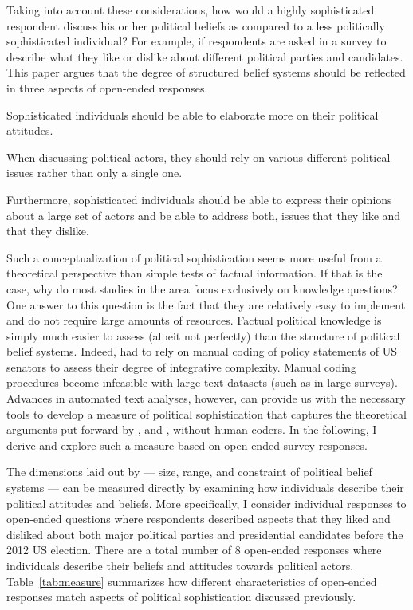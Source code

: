 \documentclass[12pt]{article}
\begin{document}
Taking into account these considerations, how would a highly sophisticated respondent discuss his or her political beliefs as compared to a less politically sophisticated individual? For example, if respondents are asked in a survey to describe what they like or dislike about different political parties and candidates. This paper argues that the degree of structured belief systems should be reflected in three aspects of open-ended responses.

Sophisticated individuals should be able to elaborate more on their political attitudes.

When discussing political actors, they should rely on various different political issues rather than only a single one.

Furthermore, sophisticated individuals should be able to express their opinions about a large set of actors and be able to address both, issues that they like and that they dislike.


Such a conceptualization of political sophistication seems more useful from a theoretical perspective than simple tests of factual information. If that is the case, why do most studies in the area focus exclusively on knowledge questions? One answer to this question is the fact that they are relatively easy to implement and do not require large amounts of resources. Factual political knowledge is simply much easier to assess (albeit not perfectly) than the structure of political belief systems. Indeed, \citet{tetlock1983cognitive} had to rely on manual coding of policy statements of US senators to assess their degree of integrative complexity. Manual coding procedures become infeasible with large text datasets (such as in large surveys). Advances in automated text analyses, however, can provide us with the necessary tools to develop a measure of political sophistication that captures the theoretical arguments put forward by \citet{converse1964nature}, \citet{tetlock1983cognitive} and \citet{luskin1987measuring}, without human coders. In the following, I derive and explore such a measure based on open-ended survey responses.

The dimensions laid out by \citet{luskin1987measuring} --- size, range, and constraint of political belief systems --- can be measured directly by examining how individuals describe their political attitudes and beliefs. More specifically, I consider individual responses to open-ended questions where respondents described aspects that they liked and disliked about both major political parties and presidential candidates before the 2012 US election. There are a total number of 8 open-ended responses where individuals describe their beliefs and attitudes towards political actors. Table~\ref{tab:measure} summarizes how different characteristics of open-ended responses match aspects of political sophistication discussed previously.
\end{document}
